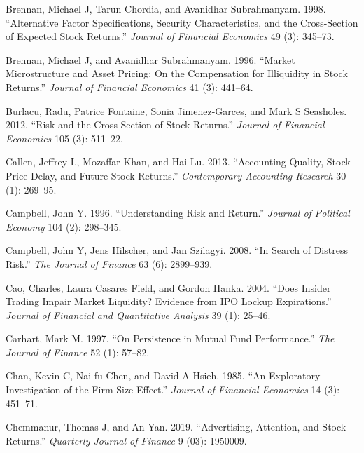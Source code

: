 \documentclass[
  letterpaper,
  DIV=11,
  numbers=noendperiod]{scrreprt}
\newlength{\cslhangindent}
\newlength{\cslentryspacingunit} %
\newenvironment{CSLReferences}[2] %
 {%
  \setlength{\parindent}{0pt}
  \ifodd #1
  \let\oldpar\par
  \def\par{\hangindent=\cslhangindent\oldpar}
  \fi
  \setlength{\parskip}{#2\cslentryspacingunit}
 }%
 {}
\begin{document}
\begin{CSLReferences}{1}{0}
\leavevmode{}%
Brennan, Michael J, Tarun Chordia, and Avanidhar Subrahmanyam. 1998.
{``Alternative Factor Specifications, Security Characteristics, and the
Cross-Section of Expected Stock Returns.''} \emph{Journal of Financial
Economics} 49 (3): 345--73.

\leavevmode{}%
Brennan, Michael J, and Avanidhar Subrahmanyam. 1996. {``Market
Microstructure and Asset Pricing: On the Compensation for Illiquidity in
Stock Returns.''} \emph{Journal of Financial Economics} 41 (3): 441--64.

\leavevmode{}%
Burlacu, Radu, Patrice Fontaine, Sonia Jimenez-Garces, and Mark S
Seasholes. 2012. {``Risk and the Cross Section of Stock Returns.''}
\emph{Journal of Financial Economics} 105 (3): 511--22.

\leavevmode{}%
Callen, Jeffrey L, Mozaffar Khan, and Hai Lu. 2013. {``Accounting
Quality, Stock Price Delay, and Future Stock Returns.''}
\emph{Contemporary Accounting Research} 30 (1): 269--95.

\leavevmode{}%
Campbell, John Y. 1996. {``Understanding Risk and Return.''}
\emph{Journal of Political Economy} 104 (2): 298--345.

\leavevmode{}%
Campbell, John Y, Jens Hilscher, and Jan Szilagyi. 2008. {``In Search of
Distress Risk.''} \emph{The Journal of Finance} 63 (6): 2899--939.

\leavevmode{}%
Cao, Charles, Laura Casares Field, and Gordon Hanka. 2004. {``Does
Insider Trading Impair Market Liquidity? Evidence from IPO Lockup
Expirations.''} \emph{Journal of Financial and Quantitative Analysis} 39
(1): 25--46.

\leavevmode{}%
Carhart, Mark M. 1997. {``On Persistence in Mutual Fund Performance.''}
\emph{The Journal of Finance} 52 (1): 57--82.

\leavevmode{}%
Chan, Kevin C, Nai-fu Chen, and David A Hsieh. 1985. {``An Exploratory
Investigation of the Firm Size Effect.''} \emph{Journal of Financial
Economics} 14 (3): 451--71.

\leavevmode{}%
Chemmanur, Thomas J, and An Yan. 2019. {``Advertising, Attention, and
Stock Returns.''} \emph{Quarterly Journal of Finance} 9 (03): 1950009.


\end{CSLReferences}
\end{document}
